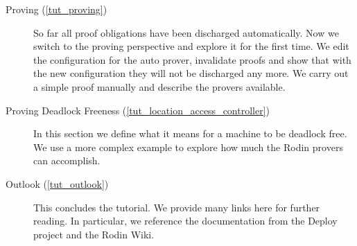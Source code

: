\begin{description}
	\item[Proving (\ref{tut_proving})] So far all proof obligations have been discharged automatically.  Now we switch to the proving perspective and explore it for the first time.
We edit the configuration for the auto prover, invalidate proofs and show that with the new configuration they will not be discharged any more.  We carry out a simple proof manually and describe the provers available.
	\item[Proving Deadlock Freeness (\ref{tut_location_access_controller})] In this section we define what it means for a machine to be deadlock free. We use a more complex example to explore how much the Rodin provers can accomplish.
	\item[Outlook (\ref{tut_outlook})] This concludes the tutorial. We provide many links here for further reading.  In particular, we reference the documentation from the Deploy project and the Rodin Wiki.
\end{description}


